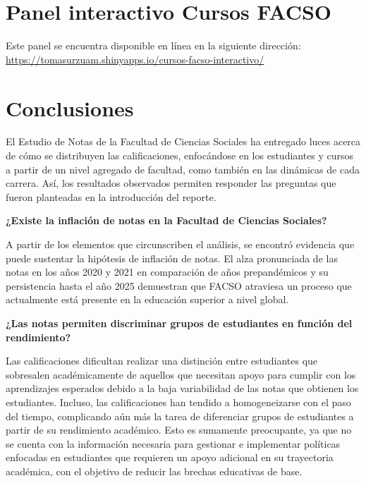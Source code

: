 \documentclass[
  spanish,
  a4paper,
  oneside]{scrbook}
\begin{document}

\chapter{Panel interactivo Cursos
FACSO}\label{panel-interactivo-cursos-facso}

Este panel se encuentra disponible en línea en la siguiente dirección:
\url{https://tomasurzuam.shinyapps.io/cursos-facso-interactivo/}


\chapter{Conclusiones}\label{conclusiones}

El Estudio de Notas de la Facultad de Ciencias Sociales ha entregado
luces acerca de cómo se distribuyen las calificaciones, enfocándose en
los estudiantes y cursos a partir de un nivel agregado de facultad, como
también en las dinámicas de cada carrera. Así, los resultados observados
permiten responder las preguntas que fueron planteadas en la
introducción del reporte.

\textbf{¿Existe la inflación de notas en la Facultad de Ciencias
Sociales?}

A partir de los elementos que circunscriben el análisis, se encontró
evidencia que puede sustentar la hipótesis de inflación de notas. El
alza pronunciada de las notas en los años 2020 y 2021 en comparación de
años prepandémicos y su persistencia hasta el año 2025 demuestran que
FACSO atraviesa un proceso que actualmente está presente en la educación
superior a nivel global.

\textbf{¿Las notas permiten discriminar grupos de estudiantes en función
del rendimiento?}

Las calificaciones dificultan realizar una distinción entre estudiantes
que sobresalen académicamente de aquellos que necesitan apoyo para
cumplir con los aprendizajes esperados debido a la baja variabilidad de
las notas que obtienen los estudiantes. Incluso, las calificaciones han
tendido a homogeneizarse con el paso del tiempo, complicando aún más la
tarea de diferenciar grupos de estudiantes a partir de su rendimiento
académico. Esto es sumamente preocupante, ya que no se cuenta con la
información necesaria para gestionar e implementar políticas enfocadas
en estudiantes que requieren un apoyo adicional en su trayectoria
académica, con el objetivo de reducir las brechas educativas de base.
\end{document}
